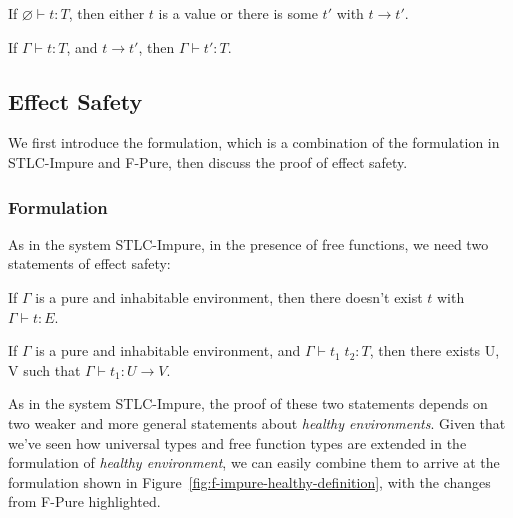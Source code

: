 \begin{theorem}[Progress]
If $\varnothing \vdash t : T$, then either $t$ is a value or there is some
$t'$ with $t \longrightarrow t'$.
\end{theorem}

\begin{theorem}[Preservation]
If $\Gamma \vdash t : T$, and $t \longrightarrow t'$, then $\Gamma
\vdash t' : T$.
\end{theorem}

\subsection{Effect Safety}

We first introduce the formulation, which is a combination of the
formulation in STLC-Impure and F-Pure, then discuss the proof of
effect safety.

\subsubsection{Formulation}

As in the system STLC-Impure, in the presence of free functions, we
need two statements of effect safety:

\begin{definition}
  If $\Gamma$ is a pure and inhabitable environment, then there
  doesn't exist $t$ with $\Gamma \vdash t : E$.
\end{definition}

\begin{definition}
  If $\Gamma$ is a pure and inhabitable environment, and
  $\Gamma \vdash t_1 \; t_2 : T$, then there exists U, V such that
  $\Gamma \vdash t_1 : U \to V$.
\end{definition}


As in the system STLC-Impure, the proof of these two statements
depends on two weaker and more general statements about \emph{healthy
  environments}. Given that we've seen how universal types and free
function types are extended in the formulation of \emph{healthy
  environment}, we can easily combine them to arrive at the
formulation shown in Figure~\ref{fig:f-impure-healthy-definition},
with the changes from F-Pure highlighted.


